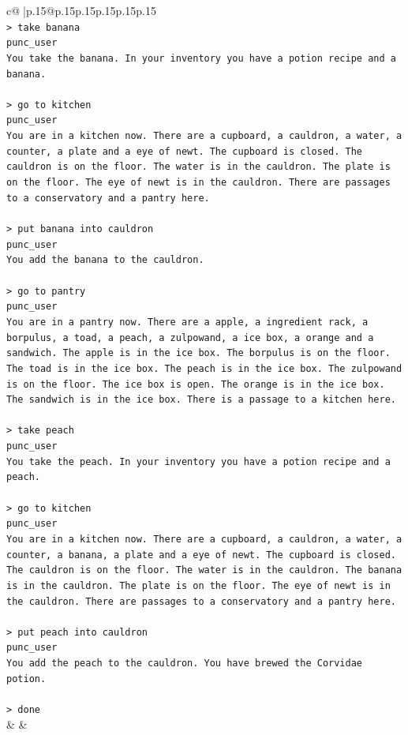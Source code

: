 \documentclass{article}
\begin{document}
{\begin{supertabular}{c@{$\;$}|p{.15\linewidth}@{}p{.15\linewidth}p{.15\linewidth}p{.15\linewidth}p{.15\linewidth}p{.15\linewidth}}
{{{\\ 
\texttt{> take banana} \\
\texttt{punc\_user} \\
\texttt{You take the banana. In your inventory you have a potion recipe and a banana.} \\
\\ 
\texttt{> go to kitchen} \\
\texttt{punc\_user} \\
\texttt{You are in a kitchen now. There are a cupboard, a cauldron, a water, a counter, a plate and a eye of newt. The cupboard is closed. The cauldron is on the floor. The water is in the cauldron. The plate is on the floor. The eye of newt is in the cauldron. There are passages to a conservatory and a pantry here.} \\
\\ 
\texttt{> put banana into cauldron} \\
\texttt{punc\_user} \\
\texttt{You add the banana to the cauldron.} \\
\\ 
\texttt{> go to pantry} \\
\texttt{punc\_user} \\
\texttt{You are in a pantry now. There are a apple, a ingredient rack, a borpulus, a toad, a peach, a zulpowand, a ice box, a orange and a sandwich. The apple is in the ice box. The borpulus is on the floor. The toad is in the ice box. The peach is in the ice box. The zulpowand is on the floor. The ice box is open. The orange is in the ice box. The sandwich is in the ice box. There is a passage to a kitchen here.} \\
\\ 
\texttt{> take peach} \\
\texttt{punc\_user} \\
\texttt{You take the peach. In your inventory you have a potion recipe and a peach.} \\
\\ 
\texttt{> go to kitchen} \\
\texttt{punc\_user} \\
\texttt{You are in a kitchen now. There are a cupboard, a cauldron, a water, a counter, a banana, a plate and a eye of newt. The cupboard is closed. The cauldron is on the floor. The water is in the cauldron. The banana is in the cauldron. The plate is on the floor. The eye of newt is in the cauldron. There are passages to a conservatory and a pantry here.} \\
\\ 
\texttt{> put peach into cauldron} \\
\texttt{punc\_user} \\
\texttt{You add the peach to the cauldron. You have brewed the Corvidae potion.} \\
\\ 
\texttt{> done} \\
            }
        }
    }
    & & \\ \\


\end{supertabular}}
\end{document}

